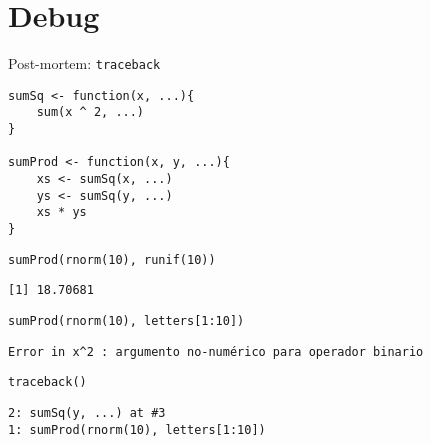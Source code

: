 \documentclass[xcolor={usenames,svgnames,dvipsnames}]{beamer}
\begin{document}
\section{Debug}
\label{sec:orgb55c601}

\begin{frame}[fragile,label={sec:org1a0513d}]{Post-mortem: \texttt{traceback}}
 \lstset{language=r,label= ,caption= ,captionpos=b,numbers=none}
\begin{lstlisting}
sumSq <- function(x, ...){
    sum(x ^ 2, ...)
}

sumProd <- function(x, y, ...){
    xs <- sumSq(x, ...)
    ys <- sumSq(y, ...)
    xs * ys
}
\end{lstlisting}

\lstset{language=r,label= ,caption= ,captionpos=b,numbers=none}
\begin{lstlisting}
sumProd(rnorm(10), runif(10))
\end{lstlisting}

\begin{verbatim}
[1] 18.70681
\end{verbatim}

\lstset{language=r,label= ,caption= ,captionpos=b,numbers=none}
\begin{lstlisting}
sumProd(rnorm(10), letters[1:10])
\end{lstlisting}

\begin{verbatim}
Error in x^2 : argumento no-numérico para operador binario
\end{verbatim}

\lstset{language=r,label= ,caption= ,captionpos=b,numbers=none}
\begin{lstlisting}
traceback()
\end{lstlisting}

\begin{verbatim}
2: sumSq(y, ...) at #3
1: sumProd(rnorm(10), letters[1:10])
\end{verbatim}
\end{frame}
\end{document}
